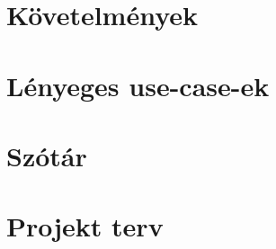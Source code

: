 \section{Követelmények}


\section{Lényeges use-case-ek}


\section{Szótár}


\section{Projekt terv}



